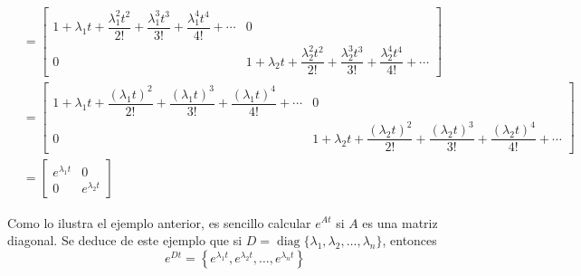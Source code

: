\begin{example}
\begin{align*}
        \\
        & = \begin{bmatrix} 1 + \lambda_1 t + \dfrac{\lambda_1^2 t^2}{2!} + \dfrac{\lambda_1^3 t^3}{3!} + \dfrac{\lambda_1^4 t^4}{4!} + \cdots & 0 \\[2mm] 0 & 1 + \lambda_2 t + \dfrac{\lambda_2^2 t^2}{2!} + \dfrac{\lambda_2^3 t^3}{3!} + \dfrac{\lambda_2^4 t^4}{4!} + \cdots \end{bmatrix} \\
        & = \begin{bmatrix} 1 + \lambda_1 t + \dfrac{(\lambda_1 t)^2}{2!} + \dfrac{(\lambda_1 t)^3}{3!} + \dfrac{(\lambda_1 t)^4}{4!} + \cdots & 0 \\[2mm] 0 & 1 + \lambda_2 t + \dfrac{(\lambda_2 t)^2}{2!} + \dfrac{(\lambda_2 t)^3}{3!} + \dfrac{(\lambda_2 t)^4}{4!} + \cdots \end{bmatrix} \\
        & = \begin{bmatrix} e^{\lambda_1 t} & 0 \\ 0 & e^{\lambda_2 t} \end{bmatrix}
    \end{align*} 
\end{example}

Como lo ilustra el ejemplo anterior, es sencillo calcular $e^{At}$ si $A$ es una matriz diagonal. Se deduce de este ejemplo que si $D = \operatorname{diag} \{ \lambda_1, \lambda_2, \dots, \lambda_n \}$, entonces
$$e^{Dt} = \left\{ e^{\lambda_1 t}, e^{\lambda_2 t}, \dots, e^{\lambda_n t} \right\}$$

\newpage

